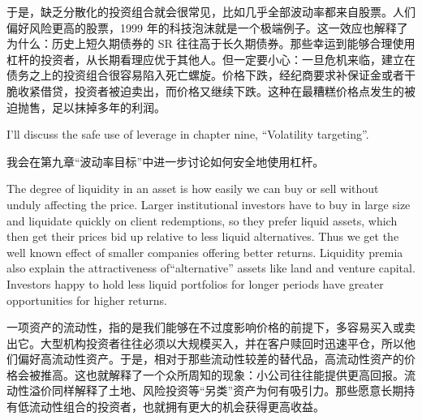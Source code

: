 \begin{chineseblock}于是，缺乏分散化的投资组合就会很常见，比如几乎全部波动率都来自股票。人们偏好风险更高的股票，1999 年的科技泡沫就是一个极端例子。这一效应也解释了为什么：历史上短久期债券的 SR 往往高于长久期债券。那些幸运到能够合理使用杠杆的投资者，从长期看理应优于其他人。但一定要小心：一旦危机来临，建立在债务之上的投资组合很容易陷入死亡螺旋。价格下跌，经纪商要求补保证金或者干脆收紧借贷，投资者被迫卖出，而价格又继续下跌。这种在最糟糕价格点发生的被迫抛售，足以抹掉多年的利润。\end{chineseblock}

\bipairgap

\begin{englishblock} I'll discuss the safe use of leverage in chapter nine, ``Volatility targeting''. \end{englishblock}

\begin{chineseblock}我会在第九章“波动率目标”中进一步讨论如何安全地使用杠杆。\end{chineseblock}


\begin{englishblock} The degree of liquidity in an asset is how easily we can buy or sell without unduly affecting the price. Larger institutional investors have to buy in large size and liquidate quickly on client redemptions, so they prefer liquid assets, which then get their prices bid up relative to less liquid alternatives. Thus we get the well known effect of smaller companies offering better returns. Liquidity premia also explain the attractiveness of``alternative'' assets like land and venture capital. Investors happy to hold less liquid portfolios for longer periods have greater opportunities for higher returns. \end{englishblock}

\begin{chineseblock}一项资产的流动性，指的是我们能够在不过度影响价格的前提下，多容易买入或卖出它。大型机构投资者往往必须以大规模买入，并在客户赎回时迅速平仓，所以他们偏好高流动性资产。于是，相对于那些流动性较差的替代品，高流动性资产的价格会被推高。这也就解释了一个众所周知的现象：小公司往往能提供更高回报。流动性溢价同样解释了土地、风险投资等“另类”资产为何有吸引力。那些愿意长期持有低流动性组合的投资者，也就拥有更大的机会获得更高收益。\end{chineseblock}

\bipairgap


